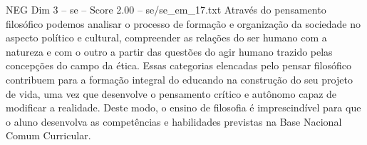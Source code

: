 \begin{textsample}{NEG Dim 3 – se – Score 2.00 – se/se\_em\_17.txt}
Através do pensamento filosófico podemos analisar o processo de formação e organização da sociedade no aspecto político e cultural, compreender as relações do ser humano com a natureza e com o outro a partir das questões do agir humano trazido pelas concepções do campo da ética.
Essas categorias elencadas pelo pensar filosófico contribuem para a formação integral do educando na construção do seu projeto de vida, uma vez que desenvolve o pensamento crítico e autônomo capaz de modificar a realidade.
Deste modo, o ensino de filosofia é imprescindível para que o aluno desenvolva as competências e habilidades previstas na Base Nacional Comum Curricular.

\end{textsample}
